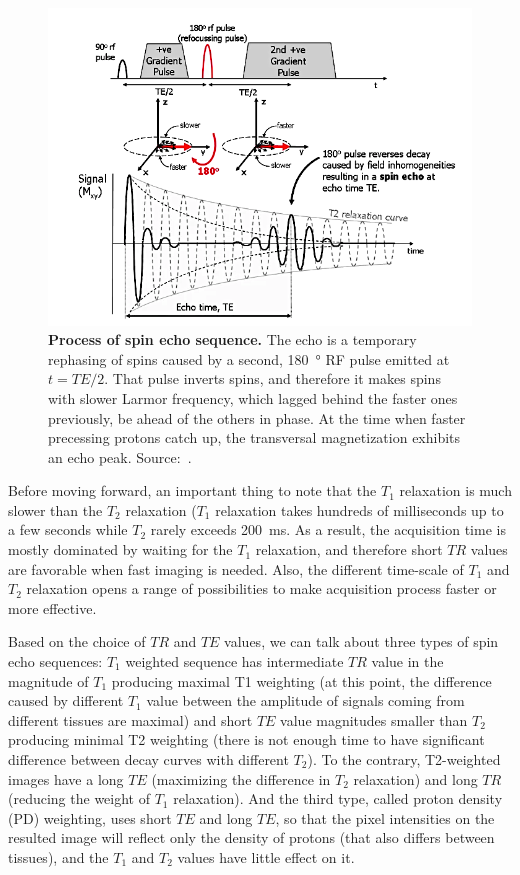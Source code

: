 \begin{figure}[tb]
    \centering
    \includegraphics[width=0.8\linewidth]{images/spin_echo.png}
    \caption{\textbf{Process of spin echo sequence.} The echo is a temporary rephasing of spins caused by a second, \SI{180}{\degree} RF pulse emitted at $t = TE/2$. That pulse inverts spins, and therefore it makes spins with slower Larmor frequency, which lagged behind the faster ones previously, be ahead of the others in phase. At the time when faster precessing protons catch up, the transversal magnetization exhibits an echo peak. Source:~\cite{ridgway_cardiovascular_2010}.}
    \label{fig:spin_echo}
\end{figure}

Before moving forward, an important thing to note that the $T_1$ relaxation is much slower than the $T_2$ relaxation ($T_1$ relaxation takes hundreds of milliseconds up to a few seconds while $T_2$ rarely exceeds \SI{200}{\milli\second}. As a result, the acquisition time is mostly dominated by waiting for the $T_1$ relaxation, and therefore short $TR$ values are favorable when fast imaging is needed. Also, the different time-scale of $T_1$ and $T_2$ relaxation opens a range of possibilities to make acquisition process faster or more effective.

Based on the choice of $TR$ and $TE$ values, we can talk about three types of spin echo sequences: $T_1$ weighted sequence has intermediate $TR$ value in the magnitude of $T_1$ producing maximal T1 weighting (at this point, the difference caused by different $T_1$ value between the amplitude of signals coming from different tissues are maximal) and short $TE$ value magnitudes smaller than $T_2$ producing minimal T2 weighting (there is not enough time to have significant difference between decay curves with different $T_2$). To the contrary, T2-weighted images have a long $TE$ (maximizing the difference in $T_2$ relaxation) and long $TR$ (reducing the weight of $T_1$ relaxation). And the third type, called proton density (PD) weighting, uses short $TE$ and long $TE$, so that the pixel intensities on the resulted image will reflect only the density of protons (that also differs between tissues), and the $T_1$ and $T_2$ values have little effect on it.

